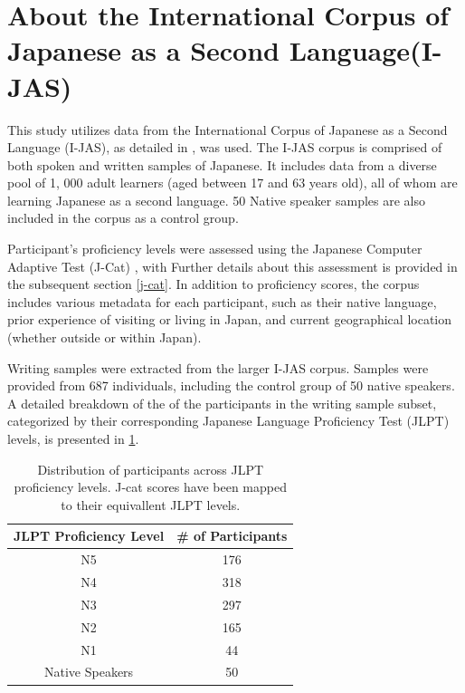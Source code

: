 \section{About the International Corpus of Japanese as a Second Language(I-JAS)}

This study utilizes data from the International Corpus of Japanese as a Second Language (I-JAS), as
detailed in
\citet{Sakoda2020}, was
used.  The
I-JAS corpus is comprised of both spoken and written samples of Japanese.  It includes data from a diverse pool of 1,
000 adult learners
(aged
between 17 and 63 years old), all of whom are learning Japanese as a second language. 50 Native speaker samples are also
included in the corpus as a control group.

Participant's proficiency levels were assessed using the Japanese Computer Adaptive Test (J-Cat)
\citep{Imai2009}, with Further details about this assessment is provided in the
subsequent
section \ref{j-cat}. In addition to proficiency scores, the corpus includes various metadata for each participant,
such as
their
native language,
prior experience of visiting or living in Japan, and current geographical location (whether outside or within Japan).

Writing samples were extracted from the larger I-JAS corpus. Samples  were provided from 687 individuals, including the
control group
of 50 native speakers. A detailed breakdown of the of the participants in the writing sample subset, categorized by
their corresponding Japanese Language Proficiency Test (JLPT) levels, is presented in \ref{tab:participants-chart}.

\begin{table}[h!]
\centering
\begin{tabular}{cc}
\hline \textbf{JLPT Proficiency Level} & \textbf{\# of Participants} \\ \hline
N5 & 176 \\
N4  & 318 \\
N3 & 297\\
N2 & 165 \\
N1 & 44 \\
Native Speakers & 50 \\
\hline
\end{tabular}
\caption{\label{tab:participants-chart} Distribution of participants across JLPT proficiency levels. J-cat scores have been mapped to their equivallent JLPT levels. }
\end{table}

